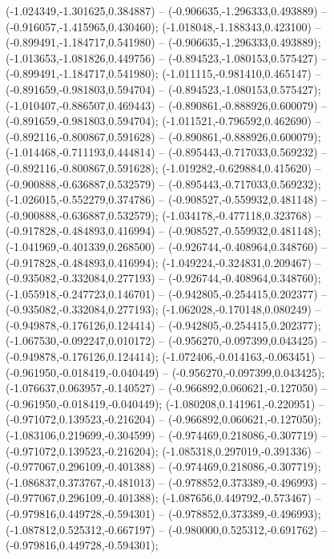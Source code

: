  (-1.024349,-1.301625,0.384887) -- (-0.906635,-1.296333,0.493889) -- (-0.916057,-1.415965,0.430460);
 (-1.018048,-1.188343,0.423100) -- (-0.899491,-1.184717,0.541980) -- (-0.906635,-1.296333,0.493889);
 (-1.013653,-1.081826,0.449756) -- (-0.894523,-1.080153,0.575427) -- (-0.899491,-1.184717,0.541980);
 (-1.011115,-0.981410,0.465147) -- (-0.891659,-0.981803,0.594704) -- (-0.894523,-1.080153,0.575427);
 (-1.010407,-0.886507,0.469443) -- (-0.890861,-0.888926,0.600079) -- (-0.891659,-0.981803,0.594704);
 (-1.011521,-0.796592,0.462690) -- (-0.892116,-0.800867,0.591628) -- (-0.890861,-0.888926,0.600079);
 (-1.014468,-0.711193,0.444814) -- (-0.895443,-0.717033,0.569232) -- (-0.892116,-0.800867,0.591628);
 (-1.019282,-0.629884,0.415620) -- (-0.900888,-0.636887,0.532579) -- (-0.895443,-0.717033,0.569232);
 (-1.026015,-0.552279,0.374786) -- (-0.908527,-0.559932,0.481148) -- (-0.900888,-0.636887,0.532579);
 (-1.034178,-0.477118,0.323768) -- (-0.917828,-0.484893,0.416994) -- (-0.908527,-0.559932,0.481148);
 (-1.041969,-0.401339,0.268500) -- (-0.926744,-0.408964,0.348760) -- (-0.917828,-0.484893,0.416994);
 (-1.049224,-0.324831,0.209467) -- (-0.935082,-0.332084,0.277193) -- (-0.926744,-0.408964,0.348760);
 (-1.055918,-0.247723,0.146701) -- (-0.942805,-0.254415,0.202377) -- (-0.935082,-0.332084,0.277193);
 (-1.062028,-0.170148,0.080249) -- (-0.949878,-0.176126,0.124414) -- (-0.942805,-0.254415,0.202377);
 (-1.067530,-0.092247,0.010172) -- (-0.956270,-0.097399,0.043425) -- (-0.949878,-0.176126,0.124414);
 (-1.072406,-0.014163,-0.063451) -- (-0.961950,-0.018419,-0.040449) -- (-0.956270,-0.097399,0.043425);
 (-1.076637,0.063957,-0.140527) -- (-0.966892,0.060621,-0.127050) -- (-0.961950,-0.018419,-0.040449);
 (-1.080208,0.141961,-0.220951) -- (-0.971072,0.139523,-0.216204) -- (-0.966892,0.060621,-0.127050);
 (-1.083106,0.219699,-0.304599) -- (-0.974469,0.218086,-0.307719) -- (-0.971072,0.139523,-0.216204);
 (-1.085318,0.297019,-0.391336) -- (-0.977067,0.296109,-0.401388) -- (-0.974469,0.218086,-0.307719);
 (-1.086837,0.373767,-0.481013) -- (-0.978852,0.373389,-0.496993) -- (-0.977067,0.296109,-0.401388);
 (-1.087656,0.449792,-0.573467) -- (-0.979816,0.449728,-0.594301) -- (-0.978852,0.373389,-0.496993);
 (-1.087812,0.525312,-0.667197) -- (-0.980000,0.525312,-0.691762) -- (-0.979816,0.449728,-0.594301);
